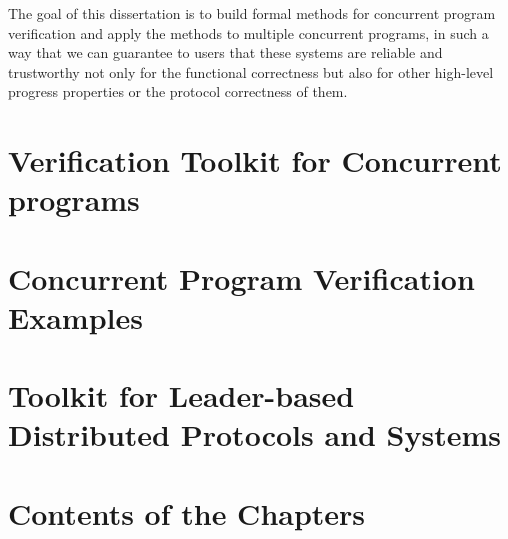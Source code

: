 
The goal of this dissertation is to build formal methods for concurrent program verification and apply the methods to multiple concurrent programs,
in such a way that we can guarantee to users that these systems are reliable and trustworthy not only for the functional correctness but also for 
other high-level progress properties or the protocol correctness of them. 

\section{Verification Toolkit for Concurrent programs}
\label{chapter:introduction:sec:verification-toolkit-for-concurrent-programs}



\section{Concurrent Program Verification Examples}
\label{chapter:introduction:sec:concurrent-program-verification-examples}

\section{Toolkit for Leader-based Distributed Protocols and Systems}
\label{chapter:introduction:sec:toolkit-for-leader-based-distributed-protocols-and-systems}


\section{Contents of the Chapters}
\label{chapter:introduction:sec:contents-of-the-chapters}


